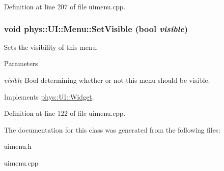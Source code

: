 Definition at line 207 of file uimenu.cpp.

\hypertarget{classphys_1_1UI_1_1Menu_a4847e0de055a9c2f708f98742fa59a87}{
\subsubsection[{SetVisible}]{\setlength{\rightskip}{0pt plus 5cm}void phys::UI::Menu::SetVisible (bool {\em visible})}}
\label{d6/dd3/classphys_1_1UI_1_1Menu_a4847e0de055a9c2f708f98742fa59a87}


Sets the visibility of this menu. 


\begin{DoxyParams}{Parameters}
\item[{\em visible}]Bool determining whether or not this menu should be visible. \end{DoxyParams}


Implements \hyperlink{classphys_1_1UI_1_1Widget_ab049233d8d5522a6ab42654b8924a3e0}{phys::UI::Widget}.



Definition at line 122 of file uimenu.cpp.



The documentation for this class was generated from the following files:\begin{DoxyCompactItemize}
\item 
uimenu.h\item 
uimenu.cpp\end{DoxyCompactItemize}
